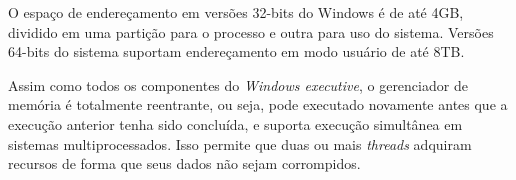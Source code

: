 	O espaço de endereçamento em versões 32-bits do Windows é de até 4GB, dividido em uma partição para o processo e outra para uso do sistema. Versões 64-bits do sistema suportam endereçamento em modo usuário de até 8TB.
	
	Assim como todos os componentes do \emph{Windows executive}, o gerenciador de memória é totalmente reentrante, ou seja, pode executado novamente antes que a execução anterior tenha sido concluída, e suporta execução simultânea em sistemas multiprocessados. Isso permite que duas ou mais \emph{threads} adquiram recursos de forma que seus dados não sejam corrompidos.